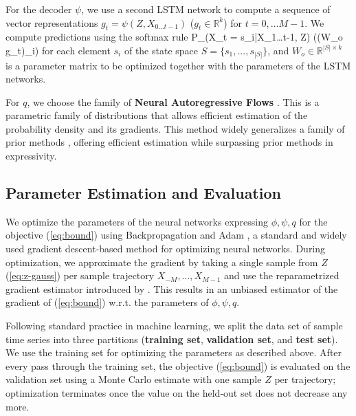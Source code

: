 \documentclass[entropy,article,submit,moreauthors,pdftex,10pt,a4paper]{Definitions/mdpi}
\newcommand{\key}{\textbf}
\let\oldequation\equation
\let\oldendequation\endequation
\renewenvironment{equation}
  {\linenomathNonumbers\oldequation}
  {\oldendequation\endlinenomath}
\begin{document}
For the decoder $\psi$, we use a second LSTM network to compute a sequence of vector representations $g_t = \psi(Z, X_{0\dots t-1})$ ($g_t \in \mathbb{R}^k$) for $t = 0, \dots M-1$.
We compute predictions using the softmax rule 
\begin{equation}
	P_\psi(X_t = s_i|X_{1\dots t-1}, Z) \propto \exp((W_o g_t)_i)
\end{equation}
for each element $s_i$ of the state space $S = \{s_1, ..., s_{|S|}\}$, and $W_o \in \mathbb{R}^{|S| \times k}$ is a parameter matrix to be optimized together with the parameters of the LSTM networks.


For $q$, we choose the family of \key{Neural Autoregressive Flows} \citep{huang-neural-2018}. 
This is a parametric family of distributions that allows efficient estimation of the probability density and its gradients.
This method widely generalizes a family of prior methods \citep{rezende-variational-2015, kingma-improving-2016, papamakarios-masked-2017}, offering efficient estimation while surpassing prior methods in expressivity.


\subsection{Parameter Estimation and Evaluation}
We optimize the parameters of the neural networks expressing $\phi, \psi, q$ for the objective (\ref{eq:bound}) using Backpropagation and Adam \citep{kingma-adam:-2014}, a standard and widely used gradient descent-based method for optimizing neural networks.
During optimization, we approximate the gradient by taking a single sample from $Z$ (\ref{eq:z-gauss}) per sample trajectory $X_{-M}, \dots, X_{M-1}$ and use the reparametrized gradient estimator introduced by \citet{kingma-auto-encoding-2014}.
This results in an unbiased estimator of the gradient of (\ref{eq:bound}) w.r.t. the parameters of $\phi, \psi, q$.

Following standard practice in machine learning, we split the data set of sample time series into three partitions (\key{training set}, \key{validation set}, and \key{test set}). 
We use the training set for optimizing the parameters as described above.
After every pass through the training set, the objective (\ref{eq:bound}) is evaluated on the validation set using a Monte Carlo estimate with one sample $Z$ per trajectory; optimization terminates once the value on the held-out set does not decrease any more.
\end{document}
